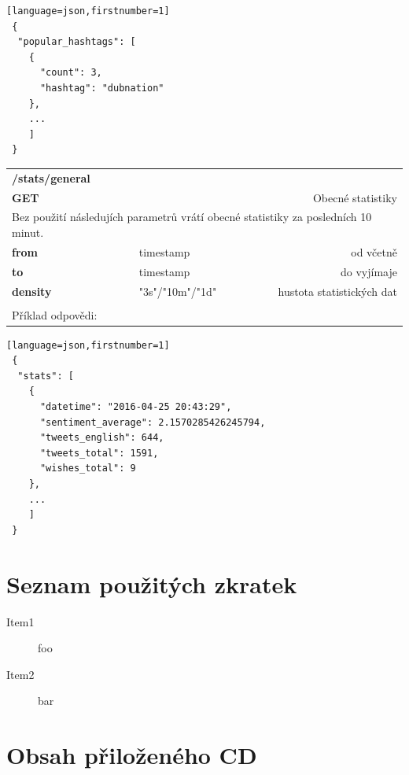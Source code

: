 \documentclass[thesis=B,czech]{FITthesis}[2012/06/26]
\begin{document}
\begin{lstlisting}[float=H][language=json,firstnumber=1]
 {
  "popular_hashtags": [
    {
      "count": 3,
      "hashtag": "dubnation"
    },
    ...
    ]
 }
\end{lstlisting} 


\begin{table}[h]
\begin{tabular}{llllr}
\rowcolor[HTML]{EFEFEF}
\large \textbf{/stats/general}        &         &                 &        & \multicolumn{1}{l}{}                \\
\rowcolor[HTML]{EFEFEF}
\textbf{GET}          &         &                 &        & Obecné statistiky                        \\
\multicolumn{5}{l}{\parbox[t]{12.8cm}{Bez použití následujích parametrů vrátí obecné statistiky za posledních 10 minut.  }  } \\
\textbf{from}         &         & timestamp       &        & od včetně                           \\
\textbf{to}           &         & timestamp       &        & do vyjímaje                         \\
\textbf{density}        &         & "3s"/"10m"/"1d"         &        & hustota statistických dat   \\
 & & & & \\
 Příklad odpovědi:   \\
\end{tabular}
\end{table}

\begin{lstlisting}[float=H][language=json,firstnumber=1]
 {
  "stats": [
    {
      "datetime": "2016-04-25 20:43:29",
      "sentiment_average": 2.1570285426245794,
      "tweets_english": 644,
      "tweets_total": 1591,
      "wishes_total": 9
    },
    ...
    ]
 }
\end{lstlisting}

\chapter{Seznam použitých zkratek}
\begin{description}
	\item[Item1] foo
	\item[Item2] bar
\end{description}

\chapter{Obsah přiloženého CD}


\begin{figure}
\end{figure}
\end{document}
